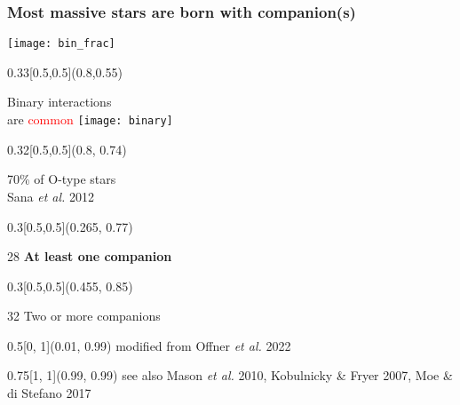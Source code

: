 \documentclass[xcolor=dvipsnames,professionalfonts, aspectratio=169]{beamer}
\begin{document}
\begin{frame}
  \frametitle{Most massive stars are born with companion(s)}
  \vspace*{-2pt}
  \texttt{[image: bin\_frac]}

  \begin{textblock}{0.33}[0.5,0.5](0.8,0.55)
    \begin{block}{\centering Binary interactions\\ are \textcolor{red}{common}}
      \centering
      \texttt{[image: binary]}\\[-1pt]
      \phantom{\tiny a}
    \end{block}
  \end{textblock}
  \begin{textblock}{0.32}[0.5,0.5](0.8, 0.74)
    \begin{center}
      \textcolor{whiteish}{70\% of O-type stars}\\[-2pt]
      \hfill\textcolor{gray!50}{\tiny Sana \emph{et al.} 2012}\,
    \end{center}
  \end{textblock}

  \begin{textblock}{0.3}[0.5,0.5](0.265, 0.77)
    \begin{rotate}{28}
      \footnotesize \textbf{At least one companion}
    \end{rotate}
  \end{textblock}

  \begin{textblock}{0.3}[0.5,0.5](0.455, 0.85)
    \begin{rotate}{32}
      \footnotesize Two or more companions
    \end{rotate}
  \end{textblock}


  \begin{textblock}{0.5}[0, 1](0.01, 0.99)
    \textcolor{gray!50}{\tiny modified from Offner \emph{et al.} 2022}
  \end{textblock}
  \begin{textblock}{0.75}[1, 1](0.99, 0.99)
    \hfill\textcolor{gray!50}{\tiny
      see also Mason \emph{et al.} 2010, Kobulnicky \& Fryer 2007,
      Moe \& di Stefano 2017}\,
  \end{textblock}
\end{frame}
\end{document}

